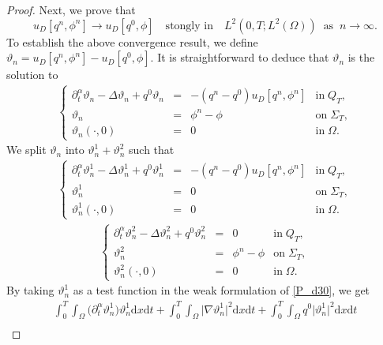 \documentclass[a4paper,12pt,reqno,natbib]{amsart}
\newcommand{\dx} {\displaystyle\mathrm{d}x}
\newcommand{\dt} {\displaystyle\mathrm{d}t}
\begin{document}
{\begin{proof}
Next, we prove that
\begin{equation}\label{convergancefaible-DDD}
    u_D[q^n, \phi^n] \longrightarrow u_D[q^0, \phi] \quad \text{stongly in} \quad L^2(0, T; L^2(\Omega)) \;\; \text{as} \;\; n \longrightarrow \infty.
\end{equation}
To establish the above convergence result, we define $\vartheta_n = u_D[q^n, \phi^n] - u_D[q^0, \phi]$. It is straightforward to deduce that $\vartheta_n$ is the solution to
\begin{eqnarray*} %
\left\{
  \begin{array}{rcll}
    \partial_t^\alpha \vartheta_n - \Delta \vartheta_n + q^0 \vartheta_n &=& -(q^n - q^0) u_D[q^n, \phi^n] & \text{in} \; Q_T, \\
    \vartheta_n &=& \phi^n - \phi & \text{on} \; \Sigma_T, \\
    \vartheta_n(\cdot, 0) &=& 0 & \text{in} \; \Omega.
  \end{array}
\right.
\end{eqnarray*}
We split $\vartheta_n$ into $\vartheta_n^1 + \vartheta_n^2$ such that
\begin{eqnarray} \label{P_d30}
\left\{
  \begin{array}{rcll}
    \partial_t^\alpha \vartheta_n^1 - \Delta \vartheta_n^1 + q^0 \vartheta_n^1 &=& -(q^n - q^0) u_D[q^n, \phi^n] & \text{in} \; Q_T, \\
    \vartheta_n^1 &=& 0 & \text{on} \; \Sigma_T, \\
    \vartheta_n^1(\cdot, 0) &=& 0 & \text{in} \; \Omega.
  \end{array}
\right.
\end{eqnarray}
\begin{eqnarray*} %
\left\{
  \begin{array}{rcll}
    \partial_t^\alpha \vartheta_n^2 - \Delta \vartheta_n^2 + q^0 \vartheta_n^2 &=& 0 & \text{in} \; Q_T, \\
    \vartheta_n^2 &=& \phi^n - \phi & \text{on} \; \Sigma_T, \\
    \vartheta_n^2(\cdot, 0) &=& 0 & \text{in} \; \Omega.
  \end{array}
\right.
\end{eqnarray*}
By taking $\vartheta_n^1$ as a test function in the weak formulation of \eqref{P_d30}, we get
\begin{align*}
    \int_0^T \int_\Omega \Big(\partial_t^\alpha \vartheta_n^1\Big) \vartheta_n^1 \dx \dt + \int_0^T \int_\Omega \Big|\nabla \vartheta_n^1\Big|^2 \dx \dt + \int_0^T \int_\Omega q^0 \Big|\vartheta_n^1\Big|^2 \dx \dt \\

\end{align*}
\end{proof}}
\end{document}
